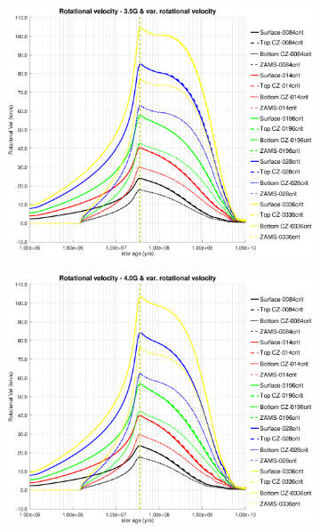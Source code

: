 \documentclass[fleqn,usenatbib]{mnras}
\begin{document}
{{\begin{figure}
    \begin{subfigure}[h]{0.47\textwidth}
    \includegraphics[trim = 30mm 15mm 20mm 15mm, clip,width=\textwidth]{figures/rot_vel_var_vel_3_5g.eps}
    \label{fig:subim43}
    \end{subfigure}
    \begin{subfigure}[h]{0.47\textwidth}
    \includegraphics[trim = 30mm 15mm 20mm 15mm, clip,width=\textwidth]{figures/rot_vel_var_vel_4_0g.eps}
    \label{fig:subim44}
    \end{subfigure}
    \begin{subfigure}[h]{0.47\textwidth}

\end{subfigure}
\end{figure}}}
\end{document}
